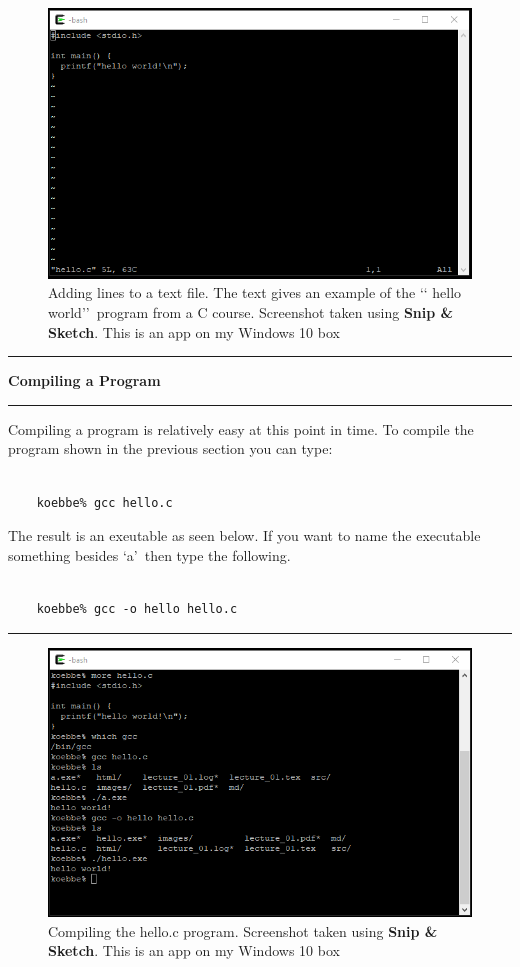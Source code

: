 \documentclass[10pt,fleqn]{article}
\begin{document}
\begin{figure}[h]
\centering
\includegraphics{../images/cygwin_07.png}
\caption{Adding lines to a text file. The text gives an example of the \lq\lq
         hello world\rq\rq\ program from a C course. Screenshot taken using
         {\bf Snip \& Sketch}. This is an app on my Windows 10 box}
\end{figure}
\eject
\vskip0.1in\hrule\vskip0.1in
\noindent
{\large{\bf Compiling a Program}}
\vskip0.1in\hrule\vskip0.1in
\noindent
Compiling a program is relatively easy at this point in time. To compile the
program shown in the previous section you can type:
\begin{verbatim}

    koebbe% gcc hello.c

\end{verbatim}
The result is an exeutable as seen below. If you want to name the executable
something besides \lq a\rq\ then type the following.
\begin{verbatim}

    koebbe% gcc -o hello hello.c

\end{verbatim}
\vskip0.1in\hrule\vskip0.1in
\vfill
\begin{figure}[h]
\centering
\includegraphics{../images/cygwin_08.png}
\caption{Compiling the hello.c program. Screenshot taken using
        {\bf Snip \& Sketch}. This is an app on my Windows 10 box}
\end{figure}
\end{document}
